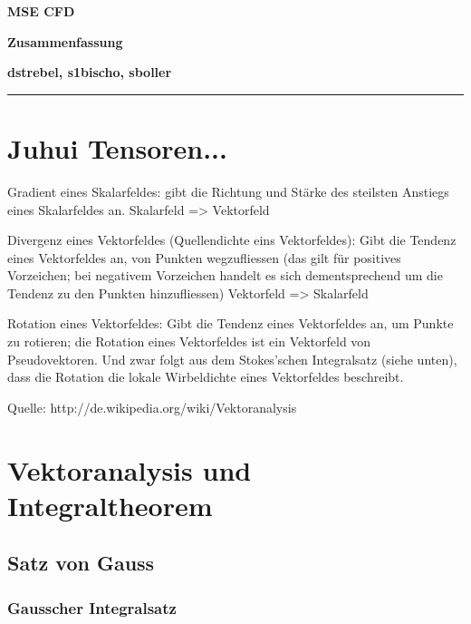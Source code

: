 \documentclass[a4paper]{scrartcl}
\begin{document}
\pagestyle{fancy}
\setlength{\footskip}{10mm}
\fancyhf{}
\renewcommand{\headrulewidth}{0pt}
\renewcommand{\footrulewidth}{0.5pt}

 \centerline{\LARGE \bf \textsf{MSE CFD}} 
 \smallskip
\centerline{\Large \bf \textsf {Zusammenfassung}}
\medskip
  \centerline{\bf \textsf{dstrebel, s1bischo, sboller }}

 \smallskip \noindent\rule{\textwidth}{0.5pt}
\smallskip%



\section{Juhui Tensoren...}

Gradient eines Skalarfeldes: gibt die Richtung und Stärke des steilsten Anstiegs eines Skalarfeldes an.
Skalarfeld => Vektorfeld

Divergenz eines Vektorfeldes (Quellendichte eins Vektorfeldes): Gibt die Tendenz eines Vektorfeldes an, von Punkten wegzufliessen (das gilt für positives Vorzeichen; bei negativem Vorzeichen handelt es sich dementsprechend um die Tendenz zu den Punkten hinzufliessen)
Vektorfeld => Skalarfeld

Rotation eines Vektorfeldes: Gibt die Tendenz eines Vektorfeldes an, um Punkte zu rotieren; die Rotation eines Vektorfeldes ist ein Vektorfeld von Pseudovektoren. Und zwar folgt aus dem Stokes’schen Integralsatz (siehe unten), dass die Rotation die lokale Wirbeldichte eines Vektorfeldes beschreibt.

Quelle: http://de.wikipedia.org/wiki/Vektoranalysis

\section{Vektoranalysis und Integraltheorem}
\subsection{Satz von Gauss}
\subsubsection{Gausscher Integralsatz}
\end{document}
